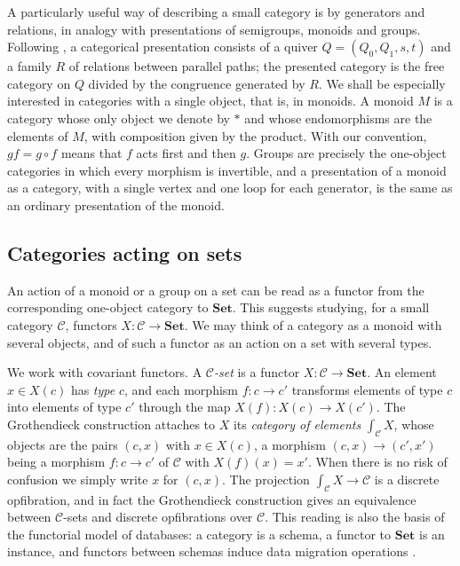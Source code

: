\documentclass[11pt]{amsart}
\theoremstyle{definition}
\theoremstyle{remark}
\numberwithin{figure}{section}%
\newcommand{\CC}{\mathcal{C}}
\newcommand{\Set}{\mathbf{Set}}
\begin{document}
A particularly useful way of describing a small category is by generators and relations, in analogy with presentations of semigroups, monoids and groups. Following \cite{Poly}, a categorical presentation consists of a quiver $Q=(Q_0,Q_1,s,t)$ and a family $R$ of relations between parallel paths; the presented category is the free category on $Q$ divided by the congruence generated by $R$. We shall be especially interested in categories with a single object, that is, in monoids. A monoid $M$ is a category whose only object we denote by $*$ and whose endomorphisms are the elements of $M$, with composition given by the product. With our convention, $gf=g\circ f$ means that $f$ acts first and then $g$. Groups are precisely the one-object categories in which every morphism is invertible, and a presentation of a monoid as a category, with a single vertex and one loop for each generator, is the same as an ordinary presentation of the monoid.

\subsection{Categories acting on sets}
\label{subsec:categories-acting-sets}

An action of a monoid or a group on a set can be read as a functor from the corresponding one-object category to $\Set$. This suggests studying, for a small category $\CC$, functors $X\colon\CC\to\Set$. We may think of a category as a monoid with several objects, and of such a functor as an action on a set with several types.

We work with covariant functors. A \emph{$\CC$-set} is a functor $X\colon\CC\to\Set$. An element $x\in X(c)$ has \emph{type} $c$, and each morphism $f\colon c\to c'$ transforms elements of type $c$ into elements of type $c'$ through the map $X(f)\colon X(c)\to X(c')$. The Grothendieck construction attaches to $X$ its \emph{category of elements} $\int_{\CC}X$, whose objects are the pairs $(c,x)$ with $x\in X(c)$, a morphism $(c,x)\to(c',x')$ being a morphism $f\colon c\to c'$ of $\CC$ with $X(f)(x)=x'$. When there is no risk of confusion we simply write $x$ for $(c,x)$. The projection $\int_{\CC}X\to\CC$ is a discrete opfibration, and in fact the Grothendieck construction gives an equivalence between $\CC$-sets and discrete opfibrations over $\CC$. This reading is also the basis of the functorial model of databases: a category is a schema, a functor to $\Set$ is an instance, and functors between schemas induce data migration operations \cite{SevenSketches,SpivakDataMigration,SpivakDatabaseQueries}.
\end{document}
